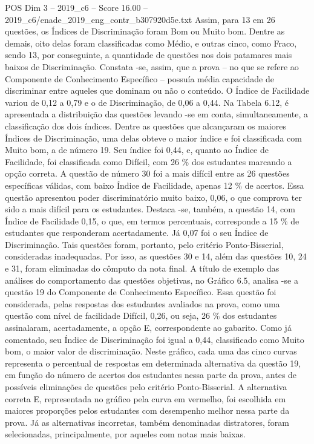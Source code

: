 \begin{textsample}{POS Dim 3 – 2019\_c6 – Score 16.00 – 2019\_c6/enade\_2019\_eng\_contr\_b307920d5e.txt}
Assim, para 13 em 26 questões, os Índices de Discriminação foram Bom ou Muito bom.
Dentre as demais, oito delas foram classificadas como Médio, e outras cinco, como Fraco, sendo 13, por conseguinte, a quantidade de questões nos dois patamares mais baixos de Discriminação.
Constata -se, assim, que a prova – no que se refere ao Componente de Conhecimento Específico – possuía média capacidade de discriminar entre aqueles que dominam ou não o conteúdo.
O Índice de Facilidade variou de 0,12 a 0,79 e o de Discriminação, de 0,06 a 0,44.
Na Tabela 6.12, é apresentada a distribuição das questões levando -se em conta, simultaneamente, a classificação dos dois índices.
Dentre as questões que alcançaram os maiores Índices de Discriminação, uma delas obteve o maior índice e foi classificada com Muito bom, a de número 19.
Seu índice foi 0,44, e, quanto ao Índice de Facilidade, foi classificada como Difícil, com 26 \% dos estudantes marcando a opção correta.
A questão de número 30 foi a mais difícil entre as 26 questões específicas válidas, com baixo Índice de Facilidade, apenas 12 \% de acertos.
Essa questão apresentou poder discriminatório muito baixo, 0,06, o que comprova ter sido a mais difícil para os estudantes.
Destaca -se, também, a questão 14, com Índice de Facilidade 0,15, o que, em termos percentuais, corresponde a 15 \% de estudantes que responderam acertadamente.
Já 0,07 foi o seu Índice de Discriminação.
Tais questões foram, portanto, pelo critério Ponto-Bisserial, consideradas inadequadas.
Por isso, as questões 30 e 14, além das questões 10, 24 e 31, foram eliminadas do cômputo da nota final.
A título de exemplo das análises do comportamento das questões objetivas, no Gráfico 6.5, analisa -se a questão 19 do Componente de Conhecimento Específico.
Essa questão foi considerada, pelas respostas dos estudantes avaliados na prova, como uma questão com nível de facilidade Difícil, 0,26, ou seja, 26 \% dos estudantes assinalaram, acertadamente, a opção E, correspondente ao gabarito.
Como já comentado, seu Índice de Discriminação foi igual a 0,44, classificado como Muito bom, o maior valor de discriminação.
Neste gráfico, cada uma das cinco curvas representa o percentual de respostas em determinada alternativa da questão 19, em função do número de acertos dos estudantes nessa parte da prova, antes de possíveis eliminações de questões pelo critério Ponto-Bisserial.
A alternativa correta E, representada no gráfico pela curva em vermelho, foi escolhida em maiores proporções pelos estudantes com desempenho melhor nessa parte da prova.
Já as alternativas incorretas, também denominadas distratores, foram selecionadas, principalmente, por aqueles com notas mais baixas.

\end{textsample}
